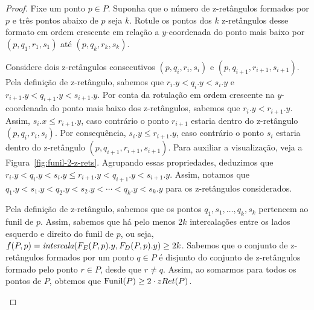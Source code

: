 \begin{proof}
    Fixe um ponto $p \in P$. Suponha que o número de z-retângulos formados por $p$ e três pontos abaixo de $p$ seja $k$. Rotule os pontos dos $k$ z-retângulos desse formato em ordem crescente em relação a $y$-coordenada do ponto mais baixo por $(p,q_1,r_1,s_1)$ até $(p,q_k,r_k,s_k)$.

    Considere dois z-retângulos consecutivos $(p,q_i,r_i,s_i)$ e $(p,q_{i+1},r_{i+1},s_{i+1})$. Pela definição de z-retângulo, sabemos que $r_i.y < q_i.y < s_i.y$ e $r_{i+1}.y < q_{i+1}.y < s_{i+1}.y$. Por conta da rotulação em ordem crescente na $y$-coordenada do ponto mais baixo dos z-retângulos, sabemos que $r_i.y < r_{i+1}.y$. Assim, $s_i.x \leq r_{i+1}.y$, caso contrário o ponto $r_{i+1}$ estaria dentro do z-retângulo $(p,q_i,r_i,s_i)$. Por consequência, $s_i.y \leq r_{i+1}.y$, caso contrário o ponto $s_i$ estaria dentro do z-retângulo $(p,q_{i+1},r_{i+1},s_{i+1})$. Para auxiliar a visualização, veja a Figura~\ref{fig:funil-2-z-rets}. Agrupando essas propriedades, deduzimos que $r_i.y < q_i.y < s_i.y \leq r_{i+1}.y < q_{i+1}.y < s_{i+1}.y$. Assim, notamos que $q_1.y < s_1.y < q_2.y < s_2.y < \cdots < q_k.y < s_k.y$ para os z-retângulos considerados.

    Pela definição de z-retângulo, sabemos que os pontos $q_1,s_1,\ldots,q_k,s_k$ pertencem ao funil de $p$. Assim, sabemos que há pelo menos $2k$ intercalações entre os lados esquerdo e direito do funil de  $p$, ou seja, $f(P,p) = \emph{intercala}(F_E(P,p).y, F_D(P,p).y) \geq 2k$. Sabemos que o conjunto de z-retângulos formados por um ponto $q \in P$ é disjunto do conjunto de z-retângulos formado pelo ponto $r \in P$, desde que $r \neq q$. Assim, ao somarmos para todos os pontos de $P$, obtemos que $\mathrm{Funil}(P) \geq 2 \cdot zRet(P)$.

    \begin{figure}
\end{figure}
\end{proof}
